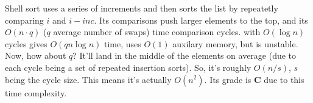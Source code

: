 \documentclass{article}
\begin{document}
Shell sort uses a series of increments and then sorts the list 
by repeatetly comparing $i$ and $i - inc$. Its comparisons push 
larger 
elements to the top, and its $O(n \cdot q)$ ($q$ average number 
of swaps) time comparison cycles.
with $O(\log n)$ cycles gives $O(qn \log n)$ time, uses 
$O(1)$ auxilary memory, but is unstable. Now, how about $q$?
It'll land in the middle of the elements on average (due to 
each cycle being a set of repeated insertion sorts). So, it's roughly
$O(n/s)$, $s$ being the cycle size. This means it's actually $O(n^2)$. 
Its grade is \textbf{C} due to this time complexity.
\end{document}
